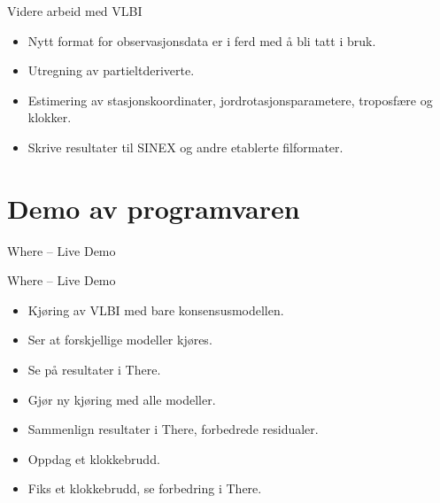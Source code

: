 \documentclass[12pt,table,t]{beamer}
\begin{document}
\begin{frame}{Videre arbeid med VLBI}

  \begin{itemize}
  \item Nytt format for observasjonsdata er i ferd med å bli tatt i bruk.
  \item Utregning av partieltderiverte.
  \item Estimering av stasjonskoordinater, jordrotasjonsparametere, troposfære og klokker.
  \item Skrive resultater til SINEX og andre etablerte filformater.
  \end{itemize}
\end{frame}


\section{Demo av programvaren}

\begin{frame}[c]{}
  \begin{center}
    {\Huge Where -- Live Demo}
  \end{center}
\end{frame}

\begin{frame}{Where -- Live Demo}

  \begin{itemize}
  \item Kjøring av VLBI med bare konsensusmodellen.
  \item Ser at forskjellige modeller kjøres.
  \item Se på resultater i There.
  \item Gjør ny kjøring med alle modeller.
  \item Sammenlign resultater i There, forbedrede residualer.
  \item Oppdag et klokkebrudd.
  \item Fiks et klokkebrudd, se forbedring i There.
  \end{itemize}
\end{frame}
\end{document}
